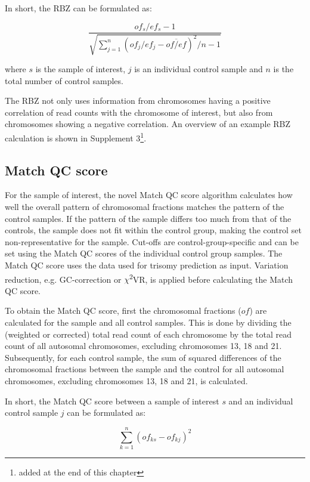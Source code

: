 In short, the RBZ can be formulated as:

\begin{equation*}
	\frac{of_s / ef_s - 1}{\sqrt{\sum^n_{j=1}(of_j / ef_j - \overline{of/ef})^2 / n - 1}}
\end{equation*}

\noindent where $s$ is the sample of interest, $j$ is an individual control sample and $n$ is the total number of control samples.

The RBZ not only uses information from chromosomes having a positive correlation of read counts with the chromosome of interest, but also from chromosomes showing a negative correlation. 
An overview of an example RBZ calculation is shown in Supplement 3\footnote{added at the end of this chapter}.

\subsection{Match QC score}
For the sample of interest, the novel Match QC score algorithm calculates how well the overall pattern of chromosomal fractions matches the pattern of the control samples. 
If the pattern of the sample differs too much from that of the controls, the sample does not fit within the control group, making the control set non-representative for the sample. 
Cut-offs are control-group-specific and can be set using the Match QC scores of the individual control group samples. 
The Match QC score uses the data used for trisomy prediction as input. 
Variation reduction, e.g. GC-correction or $\chi$\textsuperscript{2}VR, is applied before calculating the Match QC score.

To obtain the Match QC score, first the chromosomal fractions ($of$) are calculated for the sample and all control samples. 
This is done by dividing the (weighted or corrected) total read count of each chromosome by the total read count of all autosomal chromosomes, excluding chromosomes 13, 18 and 21. 
Subsequently, for each control sample, the sum of squared differences of the chromosomal fractions between the sample and the control for all autosomal chromosomes, excluding chromosomes 13, 18 and 21, is calculated.

In short, the Match QC score between a sample of interest $s$ and an individual control sample $j$ can be formulated as:

\begin{equation*}
	\sum^n_{k=1}(of_{ks} - of_{kj})^2
\end{equation*}


